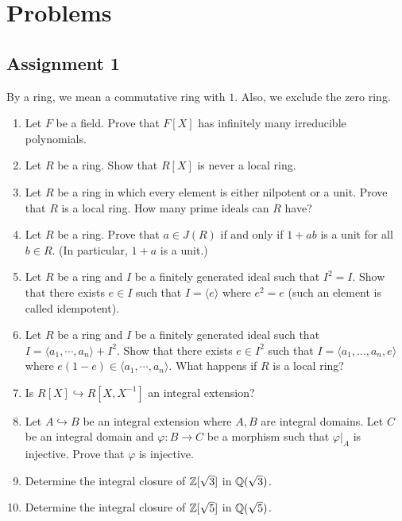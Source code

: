 \chapter{Problems}

\section{Assignment 1}

\begin{convention}
By a ring, we mean a commutative ring with $1$. Also, we exclude the zero ring.
\end{convention}

\begin{enumerate}[label=\arabic*.]

\item Let $F$ be a field. Prove that $F[X]$ has infinitely many irreducible polynomials.

\item Let $R$ be a ring. Show that $R[X]$ is never a local ring.

\item Let $R$ be a ring in which every element is either nilpotent or a unit. Prove that $R$ is a local ring. How many prime ideals can $R$ have?

\item Let $R$ be a ring. Prove that $a \in J(R)$ if and only if $1+ab$ is a unit for all $b \in R$. (In particular, $1+a$ is a unit.)

\item Let $R$ be a ring and $I$ be a finitely generated ideal such that $I^2=I$. Show that there exists $e \in I$ such that $I = \langle e \rangle$ where $e^2=e$ (such an element is called idempotent).

\item Let $R$ be a ring and $I$ be a finitely generated ideal such that $I = \langle a_1,\cdots,a_n \rangle + I^2$. Show that there exists $e \in I^2$ such that $I = \langle a_1,\ldots,a_n,e\rangle$ where $e(1-e) \in \langle a_1,\cdots,a_n\rangle$. What happens if $R$ is a local ring?

\item Is $R[X] \hookrightarrow R[X,X^{-1}]$ an integral extension?

\item Let $A \hookrightarrow B$ be an integral extension where $A,B$ are integral domains. Let $C$ be an integral domain and $\varphi: B \to C$ be a morphism such that $\varphi|_A$ is injective. Prove that $\varphi$ is injective.

\item Determine the integral closure of $\mathbb{Z}[\sqrt3]$ in $\mathbb{Q}(\sqrt3)$.

\item Determine the integral closure of $\mathbb{Z}[\sqrt5]$ in $\mathbb{Q}(\sqrt5)$.

\end{enumerate}

